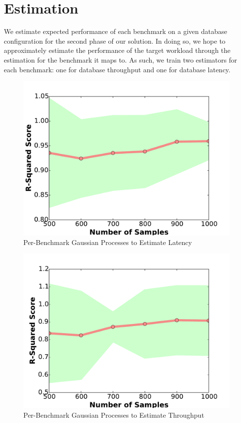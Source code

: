 \section{Estimation} \label{sec:estimation}

We estimate expected performance of each benchmark on a given database
configuration for the second phase of our solution. In doing so, we
hope to approximately estimate the performance of the target workload
through the estimation for the benchmark it maps to. As such, we train
two estimators for each benchmark: one for database throughput and one
for database latency.

\begin{figure}[h!]
    \centering
    \includegraphics[width=0.8\linewidth]{figure/gp_per_benchmark_r2_scores_latency_mutate.pdf}
    \caption{Per-Benchmark Gaussian Processes to Estimate Latency}
    \label{fig:gp_r2_latency}
\end{figure}

\begin{figure}[h!]
    \centering
    \includegraphics[width=0.8\linewidth]{figure/gp_per_benchmark_r2_scores_throughput_mutate.pdf}
    \caption{Per-Benchmark Gaussian Processes to Estimate Throughput}
    \label{fig:gp_r2_throughput}
\end{figure}

